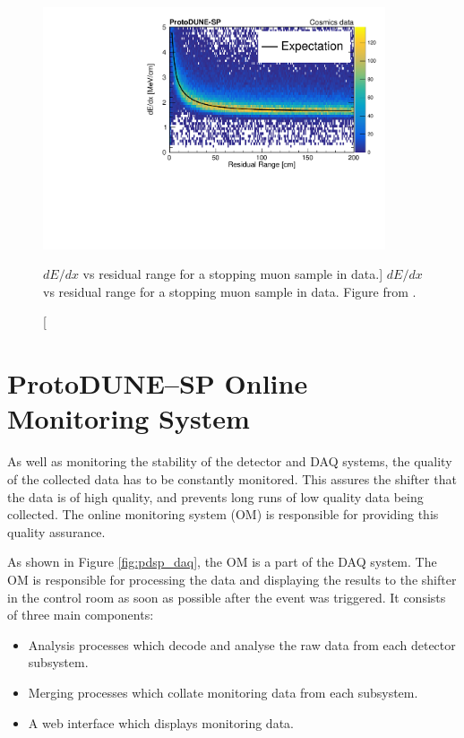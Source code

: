 \begin{figure}

	\centering

	\includegraphics[width=0.9\textwidth]{figures/dedx_v_rr.pdf}

	\caption
	[$dE/dx$ vs residual range for a stopping muon sample in \protodune{} data.]
	{$dE/dx$ vs residual range for a stopping muon sample in \protodune{} data. 
	Figure from \cite{protoduneperf}.}

	\label{fig:dedx_v_rr}

\end{figure}


\section{ProtoDUNE--SP Online Monitoring System} \label{sec:pdsp_om}

As well as monitoring the stability of the detector and DAQ systems, the quality
of the collected data has to be constantly monitored. This assures the shifter 
that the data is of high quality, and prevents long runs of low quality data
being collected. The online monitoring system (OM) is responsible for 
providing this quality assurance.

As shown in Figure \ref{fig:pdsp_daq}, the OM is a part of the \protodune{} DAQ
system. The OM is responsible for processing the data and displaying
the results to the shifter in the control room as soon as possible after the
event was triggered. It consists of three main components:
\begin{itemize}
	\item Analysis processes which decode and analyse the raw data from each 
		detector subsystem.
	\item Merging processes which collate monitoring data from each subsystem.
	\item A web interface which displays monitoring data.
\end{itemize}

